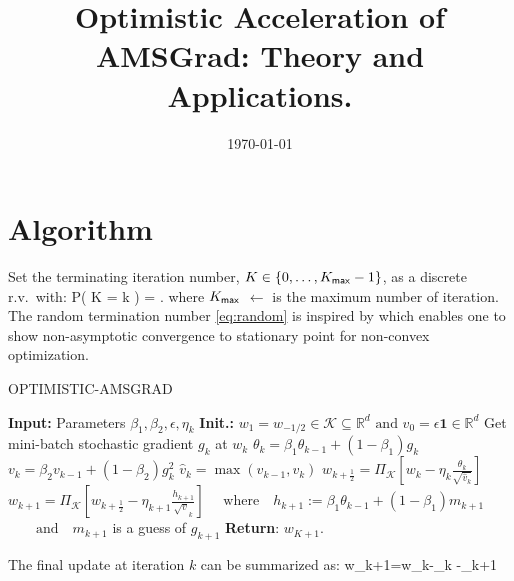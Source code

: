 \documentclass[11pt]{article}
\theoremstyle{k}
\begin{document}
\title{Optimistic Acceleration of AMSGrad: Theory and Applications.}
\date{\today}

\maketitle


\section{Algorithm}
Set the terminating iteration number, $K \in \{0,\dots,K_{\sf max}-1\}$, as a discrete r.v.~with:
\beq \label{eq:random}
   P( K = k ) = .
\eeq
where $K_{\sf max}$ $\leftarrow$ is the maximum number of iteration.
The random termination number \eqref{eq:random} is inspired by \citep{ghadimi2013stochastic} which enables one to show non-asymptotic convergence to stationary point for non-convex optimization. 

\begin{algorithm}[H]
\caption{OPTIMISTIC-AMSGRAD}\label{alg:sem}
  \begin{algorithmic}[1]
  \STATE \textbf{Input:} Parameters $\beta_{1}, \beta_{2}, \epsilon, \eta_{k}$
  \STATE \textbf{Init.:} $w_{1}=w_{-1 / 2} \in \mathcal{K} \subseteq \mathbb{R}^{d} \text { and } v_{0}=\epsilon \mathbf{1} \in \mathbb{R}^{d}$
  \STATE Get mini-batch stochastic gradient $g_{k}$ at $w_{k}$
   \STATE $\theta_{k}=\beta_{1} \theta_{k-1}+\left(1-\beta_{1}\right) g_{k}$
   \STATE $v_{k}=\beta_{2} v_{k-1}+\left(1-\beta_{2}\right) g_{k}^{2}$
   \STATE $ \hat{v}_{k}=\max \left(\hat{v}_{k-1}, v_{k}\right)$
   \STATE $ w_{k+\frac{1}{2}}=\Pi_{\mathcal{K}}\left[w_k-\eta_{k} \frac{\theta_{k}}{\sqrt{\hat{v}_{k}}}\right]$
   \STATE $ w_{k+1}=\Pi_{\mathcal{K}}\left[w_{k+\frac{1}{2}}-\eta_{k+1} \frac{h_{k+1}}{\sqrt{v}_{k}}\right]$
   \STATE $ \quad \text{where} \quad h_{k+1}:=\beta_{1} \theta_{k-1} + (1-\beta_{1}) m_{k+1}$
      \STATE $ \quad\quad \text{and} \quad m_{k+1}$ is a guess of $g_{k+1}$
\ENDFOR
\STATE \textbf{Return}: $w_{K+1}$.
  \end{algorithmic}
\end{algorithm}\vspace{.1cm}
The final update at iteration $k$ can be summarized as:
\beq\label{eq:finalupdate}
w_{k+1}=w_{k}-\eta_{k} -\eta_{k+1} 
\eeq
\end{document}

